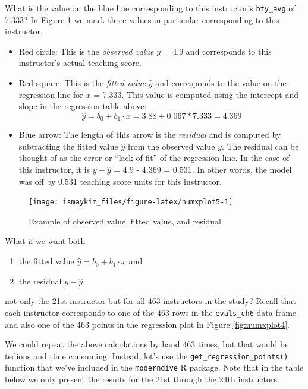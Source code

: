 \documentclass[12pt,]{krantz}
\providecommand{\tightlist}{%
  \setlength{\itemsep}{0pt}\setlength{\parskip}{0pt}}
\theoremstyle{definition}
\theoremstyle{definition}
\theoremstyle{definition}
\theoremstyle{remark}
\begin{document}
What is the value on the blue line corresponding to this instructor's
\texttt{bty\_avg} of 7.333? In Figure \ref{fig:numxplot5} we mark three
values in particular corresponding to this instructor.

\begin{itemize}
\tightlist
\item
  Red circle: This is the \emph{observed value} \(y\) = 4.9 and
  corresponds to this instructor's actual teaching score.
\item
  Red square: This is the \emph{fitted value} \(\widehat{y}\) and
  corresponds to the value on the regression line for \(x\) = 7.333.
  This value is computed using the intercept and slope in the regression
  table above:
  \[\widehat{y} = b_0 + b_1 \cdot x = 3.88 + 0.067 * 7.333 = 4.369\]
\item
  Blue arrow: The length of this arrow is the \emph{residual} and is
  computed by subtracting the fitted value \(\widehat{y}\) from the
  observed value \(y\). The residual can be thought of as the error or
  ``lack of fit'' of the regression line. In the case of this
  instructor, it is \(y - \widehat{y}\) = 4.9 - 4.369 = 0.531. In other
  words, the model was off by 0.531 teaching score units for this
  instructor.
\end{itemize}

\begin{figure}

{\centering \texttt{[image: ismaykim\_files/figure-latex/numxplot5-1]} 

}

\caption{Example of observed value, fitted value, and residual}\label{fig:numxplot5}
\end{figure}

What if we want both

\begin{enumerate}
\def\labelenumi{\arabic{enumi}.}
\tightlist
\item
  the fitted value \(\widehat{y} = b_0 + b_1 \cdot x\) and
\item
  the residual \(y - \widehat{y}\)
\end{enumerate}

not only the 21st instructor but for all 463 instructors in the study?
Recall that each instructor corresponds to one of the 463 rows in the
\texttt{evals\_ch6} data frame and also one of the 463 points in the
regression plot in Figure \ref{fig:numxplot4}.

We could repeat the above calculations by hand 463 times, but that would
be tedious and time consuming. Instead, let's use the
\texttt{get\_regression\_points()} function that we've included in the
\texttt{moderndive} R package. Note that in the table below we only
present the results for the 21st through the 24th instructors.
\end{document}

